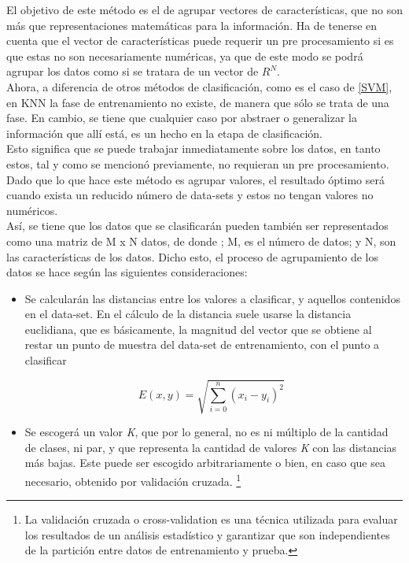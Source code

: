 \begin{itemize}
{\begin{enumerate}
\begin{enumerate}
{                El objetivo de este método es el de agrupar vectores de características, que no son más que representaciones matemáticas para la información. Ha de tenerse en cuenta que el vector de características puede requerir un pre procesamiento si es que estas no son necesariamente numéricas, ya que de este modo se podrá agrupar los datos como si se tratara de un vector de $R^{N}$.\\

                Ahora, a diferencia de otros métodos de clasificación, como es el caso de \ref{SVM}, en KNN la fase de entrenamiento no existe, de manera que sólo se trata de una fase. En cambio, se tiene que cualquier caso por abstraer o generalizar la información que allí está, es un hecho en la etapa de clasificación.\\

                Esto significa que se puede trabajar inmediatamente sobre los datos, en tanto estos, tal y como se mencionó previamente, no requieran un pre procesamiento. Dado que lo que hace este método es agrupar valores, el resultado óptimo será cuando exista un reducido número de  data-sets y estos no tengan valores no numéricos.\\

                Así, se tiene que los datos que se clasificarán pueden también ser representados como una matriz de M x N  datos, de donde ; M, es el número de datos; y N, son las características de los datos. Dicho esto, el proceso de agrupamiento de los datos se hace según las siguientes consideraciones:\\

                \begin{itemize}
                    \item {Se calcularán las distancias entre los valores a clasificar, y aquellos contenidos en el data-set. En el cálculo de la distancia suele usarse la distancia euclidiana, que es básicamente, la magnitud del vector que se obtiene al restar un punto de muestra del data-set de entrenamiento, con el punto a clasificar
    
                    \begin{equation}
                        E(x,y) = \sqrt{\sum_{i=0}^{n}({x_{i}-y_{i}})^{2}} \ \ 
                    \end{equation}
                    }

                    \item{Se escogerá un valor \textit{K}, que por lo general, no es ni múltiplo de la cantidad de clases, ni par, y que representa la cantidad de valores \textit{K} con las distancias más bajas. Este puede ser escogido arbitrariamente o bien, en caso que sea necesario, obtenido por validación cruzada. \footnote{La validación cruzada o cross-validation es una técnica utilizada para evaluar los resultados de un análisis estadístico y garantizar que son independientes de la partición entre datos de entrenamiento y prueba.}\\}
                    

\end{itemize}}
\end{enumerate}
\end{enumerate}}
\end{itemize}
